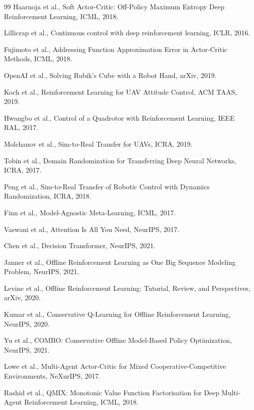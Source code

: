 \documentclass[12pt,a4paper]{ctexart}
\begin{document}
\begin{thebibliography}{99}
 Haarnoja et al., Soft Actor-Critic: Off-Policy Maximum Entropy Deep Reinforcement Learning, ICML, 2018.

 Lillicrap et al., Continuous control with deep reinforcement learning, ICLR, 2016.

 Fujimoto et al., Addressing Function Approximation Error in Actor-Critic Methods, ICML, 2018.

 OpenAI et al., Solving Rubik's Cube with a Robot Hand, arXiv, 2019.

 Koch et al., Reinforcement Learning for UAV Attitude Control, ACM TAAS, 2019.

 Hwangbo et al., Control of a Quadrotor with Reinforcement Learning, IEEE RAL, 2017.

 Molchanov et al., Sim-to-Real Transfer for UAVs, ICRA, 2019.

 Tobin et al., Domain Randomization for Transferring Deep Neural Networks, ICRA, 2017.

 Peng et al., Sim-to-Real Transfer of Robotic Control with Dynamics Randomization, ICRA, 2018.

 Finn et al., Model-Agnostic Meta-Learning, ICML, 2017.

 Vaswani et al., Attention Is All You Need, NeurIPS, 2017.

 Chen et al., Decision Transformer, NeurIPS, 2021.

 Janner et al., Offline Reinforcement Learning as One Big Sequence Modeling Problem, NeurIPS, 2021.

 Levine et al., Offline Reinforcement Learning: Tutorial, Review, and Perspectives, arXiv, 2020.

 Kumar et al., Conservative Q-Learning for Offline Reinforcement Learning, NeurIPS, 2020.

 Yu et al., COMBO: Conservative Offline Model-Based Policy Optimization, NeurIPS, 2021.

 Lowe et al., Multi-Agent Actor-Critic for Mixed Cooperative-Competitive Environments, NeXurIPS, 2017.

 Rashid et al., QMIX: Monotonic Value Function Factorisation for Deep Multi-Agent Reinforcement Learning, ICML, 2018.


\end{thebibliography}
\end{document}
